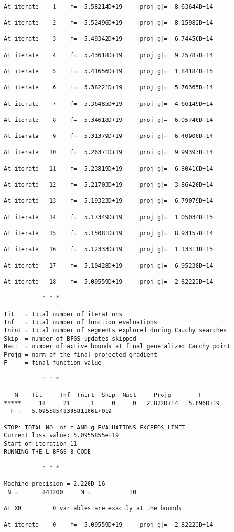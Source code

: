 \documentclass[11pt]{article}
\begin{document}
    \begin{Verbatim}[commandchars=\\\{\}]

At iterate    1    f=  5.58214D+19    |proj g|=  8.63644D+14

At iterate    2    f=  5.52496D+19    |proj g|=  8.15982D+14

At iterate    3    f=  5.49342D+19    |proj g|=  6.74456D+14

At iterate    4    f=  5.43618D+19    |proj g|=  9.25787D+14

At iterate    5    f=  5.41656D+19    |proj g|=  1.84184D+15

At iterate    6    f=  5.38221D+19    |proj g|=  5.70365D+14

At iterate    7    f=  5.36485D+19    |proj g|=  4.66149D+14

At iterate    8    f=  5.34618D+19    |proj g|=  6.95740D+14

At iterate    9    f=  5.31379D+19    |proj g|=  6.40900D+14

At iterate   10    f=  5.26371D+19    |proj g|=  9.99393D+14

At iterate   11    f=  5.23819D+19    |proj g|=  6.80416D+14

At iterate   12    f=  5.21703D+19    |proj g|=  3.86420D+14

At iterate   13    f=  5.19323D+19    |proj g|=  6.79079D+14

At iterate   14    f=  5.17349D+19    |proj g|=  1.05034D+15

At iterate   15    f=  5.15081D+19    |proj g|=  8.93157D+14

At iterate   16    f=  5.12333D+19    |proj g|=  1.13311D+15

At iterate   17    f=  5.10428D+19    |proj g|=  6.95238D+14

At iterate   18    f=  5.09559D+19    |proj g|=  2.82223D+14

           * * *

Tit   = total number of iterations
Tnf   = total number of function evaluations
Tnint = total number of segments explored during Cauchy searches
Skip  = number of BFGS updates skipped
Nact  = number of active bounds at final generalized Cauchy point
Projg = norm of the final projected gradient
F     = final function value

           * * *

   N    Tit     Tnf  Tnint  Skip  Nact     Projg        F
*****     18     21      1     0     0   2.822D+14   5.096D+19
  F =   5.0955854838581166E+019

STOP: TOTAL NO. of f AND g EVALUATIONS EXCEEDS LIMIT
Current loss value: 5.0955855e+19
Start of iteration 11
RUNNING THE L-BFGS-B CODE

           * * *

Machine precision = 2.220D-16
 N =       841200     M =           10

At X0         0 variables are exactly at the bounds

At iterate    0    f=  5.09559D+19    |proj g|=  2.82223D+14
    \end{Verbatim}
\end{document}
